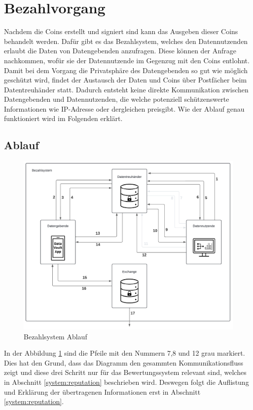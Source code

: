 \documentclass[
	fontsize=12pt,
	headings=small,
	parskip=half,           %
	bibliography=totoc,
	numbers=noenddot,       %
	open=any,               %
]{scrreprt}
\begin{document}
\section{Bezahlvorgang}
\label{system:payment}
Nachdem die Coins erstellt und signiert sind kann das Ausgeben dieser Coins behandelt werden. Dafür gibt es das Bezahlsystem,  welches den Datennutzenden erlaubt die Daten von Datengebenden anzufragen. Diese können der Anfrage nachkommen, wofür sie der Datennutzende im Gegenzug mit den Coins entlohnt. Damit bei dem Vorgang die Privatsphäre des Datengebenden so gut wie möglich geschützt wird, findet der Austausch der Daten und Coins über Postfächer beim Datentreuhänder statt. Dadurch entsteht keine direkte Kommunikation zwischen Datengebenden und Datennutzenden, die welche potenziell schützenswerte Informationen wie IP-Adresse oder dergleichen preisgibt. Wie der Ablauf genau funktioniert wird im Folgenden erklärt.

\subsection{Ablauf}
\begin{figure}[H]
    \centering
    \includegraphics[width=0.9\linewidth]{PaymentDiagramm.pdf}
    \caption{Bezahlsystem Ablauf}
    \label{fig:payment}
\end{figure} 

In der Abbildung \ref{fig:payment} sind die Pfeile mit den Nummern 7,8 und 12 grau markiert. Dies hat den Grund, dass das Diagramm den gesammten Kommunikationsfluss zeigt und diese drei Schritt nur für das Bewertungssystem relevant sind, welches in Abschnitt \ref{system:reputation} beschrieben wird. Deswegen folgt die Auflistung und Erklärung der übertragenen Informationen erst in Abschnitt \ref{system:reputation}.
\end{document}
